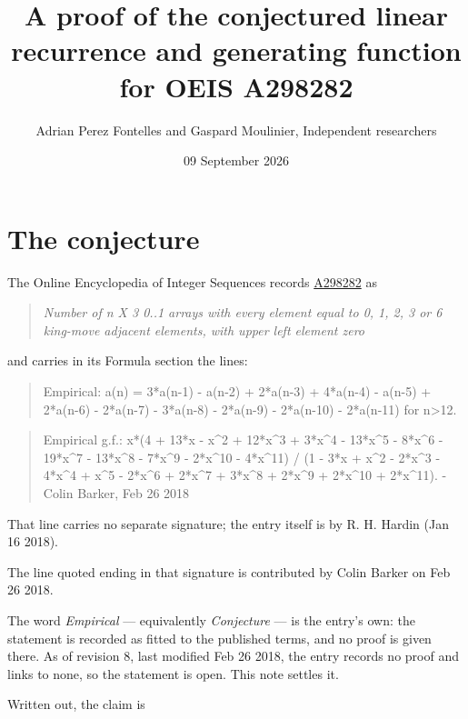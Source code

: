 \documentclass[11pt]{article}
\title{A proof of the conjectured linear recurrence and generating function for OEIS A298282}
\author{Adrian Perez Fontelles and Gaspard Moulinier, Independent researchers}
\date{09 September 2026}
\theoremstyle{definition}
\begin{document}
\maketitle
\section{The conjecture}

The Online Encyclopedia of Integer Sequences records \href{https://oeis.org/A298282}{A298282} as

\begin{quote}\itshape Number of n X 3 0..1 arrays with every element equal to 0, 1, 2, 3 or 6 king-move adjacent elements, with upper left element zero\end{quote}

and carries in its Formula section the lines:

\begin{quote}\ttfamily Empirical: a(n) = 3*a(n-1) - a(n-2) + 2*a(n-3) + 4*a(n-4) - a(n-5) + 2*a(n-6) - 2*a(n-7) - 3*a(n-8) - 2*a(n-9) - 2*a(n-10) - 2*a(n-11) for n>12.\end{quote}

\begin{quote}\ttfamily Empirical g.f.: x*(4 + 13*x - x\textasciicircum{}2 + 12*x\textasciicircum{}3 + 3*x\textasciicircum{}4 - 13*x\textasciicircum{}5 - 8*x\textasciicircum{}6 - 19*x\textasciicircum{}7 - 13*x\textasciicircum{}8 - 7*x\textasciicircum{}9 - 2*x\textasciicircum{}10 - 4*x\textasciicircum{}11) / (1 - 3*x + x\textasciicircum{}2 - 2*x\textasciicircum{}3 - 4*x\textasciicircum{}4 + x\textasciicircum{}5 - 2*x\textasciicircum{}6 + 2*x\textasciicircum{}7 + 3*x\textasciicircum{}8 + 2*x\textasciicircum{}9 + 2*x\textasciicircum{}10 + 2*x\textasciicircum{}11). - Colin Barker, Feb 26 2018\end{quote}

That line carries no separate signature; the entry itself is by R. H. Hardin (Jan 16 2018).

The line quoted ending in that signature is contributed by Colin Barker on Feb 26 2018.

The word {\itshape Empirical} --- equivalently {\itshape Conjecture} --- is the entry's own: the statement is recorded as fitted to the published terms, and no proof is given there. As of revision 8, last modified Feb 26 2018, the entry records no proof and links to none, so the statement is open. This note settles it.

Written out, the claim is
\end{document}
